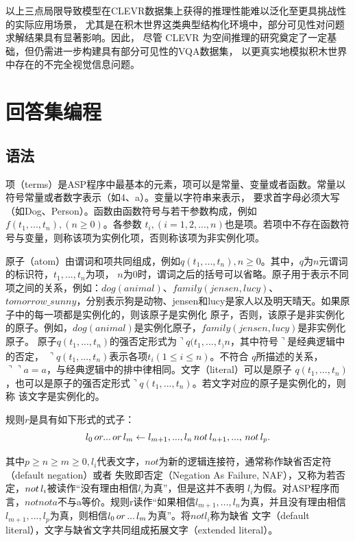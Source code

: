 以上三点局限导致模型在CLEVR数据集上获得的推理性能难以泛化至更具挑战性的实际应用场景，
尤其是在积木世界这类典型结构化环境中，部分可见性对问题求解结果具有显著影响。因此，
尽管 CLEVR 为空间推理的研究奠定了一定基础，但仍需进一步构建具有部分可见性的VQA数据集，
以更真实地模拟积木世界中存在的不完全视觉信息问题。
\section{回答集编程}
\subsection{语法}
项（terms）是ASP程序中最基本的元素，项可以是常量、变量或者函数。常量以符号常量或者数字表示（如4、a）。变量以字符串来表示，
要求首字母必须大写（如Dog、Person）。函数由函数符号与若干参数构成，例如$f(t_1,...,t_n),(n \geq 0)$。各参数
$t_i,(i=1,2,...,n)$也是项。若项中不存在函数符号与变量，则称该项为实例化项，否则称该项为非实例化项。

原子（atom）由谓词和项共同组成，例如$q(t_1,...,t_n),n \geq 0$。其中，$q$为$n$元谓词的标识符，$t_1,...,t_n$为项，
$n$为0时，谓词之后的括号可以省略。原子用于表示不同项之间的关系，例如：$dog(animal)$、$family(jensen,lucy)$、
$tomorrow\_sunny$，分别表示狗是动物、jensen和lucy是家人以及明天晴天。如果原子中的每一项都是实例化的，则该原子是实例化
原子，否则，该原子是非实例化的原子。例如，$dog(animal)$是实例化原子，$family(jensen,lucy)$是非实例化原子。
原子$q(t_1,...,t_n)$的强否定形式为$\urcorner q(t_1,...,t_)n$，其中符号$\urcorner$是经典逻辑中的否定，
$\urcorner q(t_1,...,t_n)$表示各项$t_i(1 \leq i \leq n)$。不符合
$q$所描述的关系，$\urcorner \urcorner a = a$，与经典逻辑中的排中律相同。文字（literal）可以是原子
$q(t_1,...,t_n)$，也可以是原子的强否定形式$\urcorner q(t_1,...,t_n)$。若文字对应的原子是实例化的，则称
该文字是实例化的。

\begin{definition}[规则] 规则$r$是具有如下形式的式子：
    \begin{equation}
        l_0 \thinspace or ... \thinspace or \thinspace l_m \leftarrow l_{m+1},...,l_n \thinspace not \thinspace l_{n+1},...,\thinspace not \thinspace l_p.
    \end{equation}
\end{definition}

其中$p \ge n \ge m \geq 0, l_i$代表文字，$not$为新的逻辑连接符，通常称作缺省否定符（default negation）或者
失败即否定（Negation As Failure, NAF），又称为若否定，$not \thinspace l_i$被读作“没有理由相信$l_i$为真”，但是这并不表明
$l_i$为假。对ASP程序而言，$not not a$不与a等价。规则r读作“如果相信$l_{m+1},...,l_n$为真，并且没有理由相信
$l_{m+1},...,l_p$为真，则相信$l_0 \thinspace or \thinspace ... \thinspace l_m$为真”。将$not l_i$称为缺省
文字（default literal），文字与缺省文字共同组成拓展文字（extended literal）。

